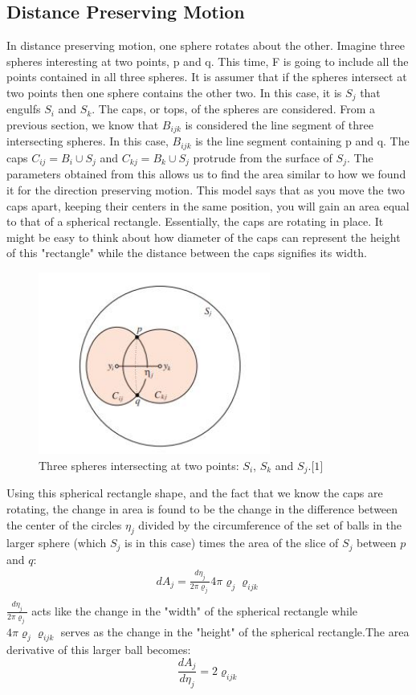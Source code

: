 \documentclass{article}
\begin{document}
\subsection{Distance Preserving Motion}
In distance preserving motion, one sphere rotates about the other. Imagine three spheres interesting at two points, p and q. This time, F is going to include all the points contained in all three spheres. It is assumer that if the spheres intersect at two points then one sphere contains the other two. In this case, it is $S_j$ that engulfs $S_i$ and $S_k$. The caps, or tops, of the spheres are considered. From a previous section, we know that $B_{ijk}$ is considered the line segment of three intersecting spheres. In this case, $B_{ijk}$ is the line segment containing p and q. The caps $C_{ij} = B_i \cup S_j$ and $C_{kj} = B_k \cup S_j$ protrude from the surface of $S_j$. The parameters obtained from this allows us to find the area similar to how we found it for the direction preserving motion. This model says that as you move the two caps apart, keeping their centers in the same position, you will gain an area equal to that of a spherical rectangle. Essentially, the caps are rotating in place. It might be easy to think about how diameter of the caps can represent the height of this "rectangle" while the distance between the caps signifies its width.
\begin{figure}[h!]
\caption{Three spheres intersecting at two points: $S_i$, $S_k$ and $S_j.\lbrack1\rbrack$}
\centerline{\includegraphics[width=3in]{Figure7}}
\end{figure}

Using this spherical rectangle shape, and the fact that we know the caps are rotating, the change in area is found to be the change in the difference between the center of the circles $\eta_j$ divided by the circumference of the set of balls in the larger sphere (which $S_j$ is in this case) times the area of the slice of $S_j$ between $p$ and $q$: 
\begin{align}
dA_j = \frac{d\eta_j}{2\pi\varrho_j}4\pi\varrho_j\varrho_{ijk}\\
\end{align}
$\frac{d\eta_j}{2\pi\varrho_j}$ acts like the change in the "width" of the spherical rectangle while $4\pi\varrho_j\varrho_{ijk}$ serves as the change in the "height" of the spherical rectangle.The area derivative of this larger ball becomes:
\begin{equation*}
\frac{dA_j}{d\eta_j }= 2\varrho_{ijk}
\end{equation*}
\end{document}
